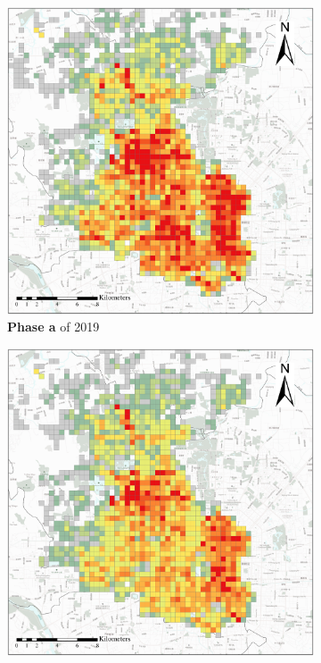 \documentclass[preprints,ijgi,submit,moreauthors]{Definitions/mdpi}
\begin{document}
\begin{figure}[ht]
    \vspace{6pt}
    \begin{subfigure}{.28\textwidth}
        \includegraphics[width=\textwidth]{Figures/BSSPhase1_2019.eps}
        \caption{\textbf{Phase a} of 2019}\label{fig:p_a_2019}
    \end{subfigure}
    \begin{subfigure}{.28\textwidth}
        \includegraphics[width=\textwidth]{Figures/BSSPhase2_2019.eps}

\end{subfigure}
\end{figure}
\end{document}
